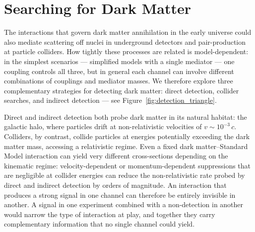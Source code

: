 
\section{Searching for Dark Matter}
\label{sec:1.3}

The interactions that govern dark matter annihilation in the early universe could also mediate scattering off nuclei in underground detectors and pair-production at particle colliders.
How tightly these processes are related is model-dependent: in the simplest scenarios --- simplified models with a single mediator --- one coupling controls all three, but in general each channel can involve different combinations of couplings and mediator masses.
We therefore explore three complementary strategies for detecting dark matter: direct detection, collider searches, and indirect detection --- see Figure~\ref{fig:detection_triangle}.

Direct and indirect detection both probe dark matter in its natural habitat: the galactic halo, where particles drift at non-relativistic velocities of $v \sim 10^{-3}\,c$.
Colliders, by contrast, collide particles at energies potentially exceeding the dark matter mass, accessing a relativistic regime.
Even a fixed dark matter--Standard Model interaction can yield very different cross-sections depending on the kinematic regime: velocity-dependent or momentum-dependent suppressions that are negligible at collider energies can reduce the non-relativistic rate probed by direct and indirect detection by orders of magnitude.
An interaction that produces a strong signal in one channel can therefore be entirely invisible in another.
A signal in one experiment combined with a non-detection in another would narrow the type of interaction at play, and together they carry complementary information that no single channel could yield.


